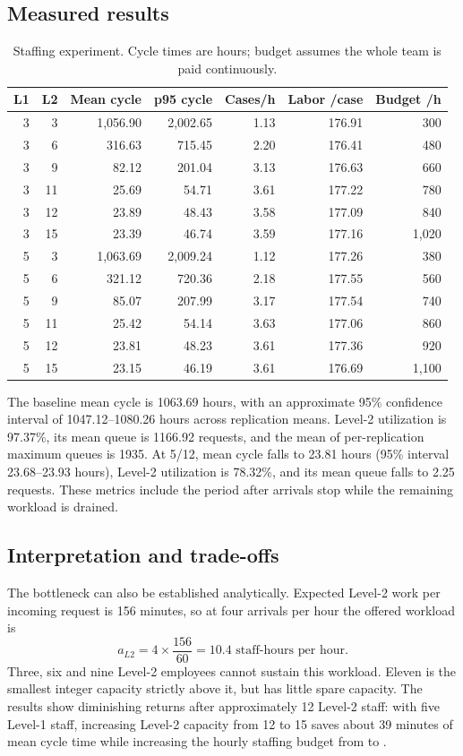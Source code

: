 \documentclass[10pt,a4paper]{article}
\newcommand{\EUR}{\texteuro}
\begin{document}
\subsection{Measured results}
\begin{table}[htbp]
\centering\small
\caption{Staffing experiment. Cycle times are hours; budget assumes the whole team
is paid continuously.}
\label{tab:staffing}
\begin{tabular}{rrrrrrr}
\toprule
L1 & L2 & Mean cycle & p95 cycle & Cases/h & Labor \EUR/case & Budget \EUR/h\\
\midrule
3 & 3 & 1,056.90 & 2,002.65 & 1.13 & 176.91 & 300 \\
3 & 6 & 316.63 & 715.45 & 2.20 & 176.41 & 480 \\
3 & 9 & 82.12 & 201.04 & 3.13 & 176.63 & 660 \\
3 & 11 & 25.69 & 54.71 & 3.61 & 177.22 & 780 \\
3 & 12 & 23.89 & 48.43 & 3.58 & 177.09 & 840 \\
3 & 15 & 23.39 & 46.74 & 3.59 & 177.16 & 1,020 \\
5 & 3 & 1,063.69 & 2,009.24 & 1.12 & 177.26 & 380 \\
5 & 6 & 321.12 & 720.36 & 2.18 & 177.55 & 560 \\
5 & 9 & 85.07 & 207.99 & 3.17 & 177.54 & 740 \\
5 & 11 & 25.42 & 54.14 & 3.63 & 177.06 & 860 \\
5 & 12 & 23.81 & 48.23 & 3.61 & 177.36 & 920 \\
5 & 15 & 23.15 & 46.19 & 3.61 & 176.69 & 1,100 \\
\bottomrule
\end{tabular}
\end{table}

The baseline mean cycle is 1063.69 hours, with an approximate 95\% confidence
interval of 1047.12--1080.26 hours across replication means. Level-2 utilization
is 97.37\%, its mean queue is 1166.92 requests, and the mean of per-replication
maximum queues is 1935. At 5/12, mean cycle falls to 23.81 hours (95\% interval
23.68--23.93 hours), Level-2 utilization is 78.32\%, and its mean queue falls to
2.25 requests. These metrics include the period after arrivals stop while the
remaining workload is drained.

\subsection{Interpretation and trade-offs}
The bottleneck can also be established analytically. Expected Level-2 work per
incoming request is 156 minutes, so at four arrivals per hour the offered workload is
\[
 a_{L2}=4\times\frac{156}{60}=10.4\text{ staff-hours per hour}.
\]
Three, six and nine Level-2 employees cannot sustain this workload. Eleven is the
smallest integer capacity strictly above it, but has little spare capacity.
The results show diminishing returns after approximately 12 Level-2 staff:
with five Level-1 staff, increasing Level-2 capacity from 12 to 15 saves about
39 minutes of mean cycle time while increasing the hourly staffing budget from
\EUR920 to \EUR1100.
\end{document}

